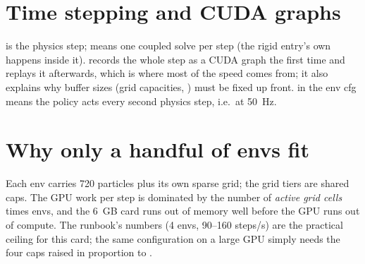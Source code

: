 \section{Time stepping and CUDA graphs}

 is the physics step; 
means one coupled solve per step (the rigid entry's own 
happens inside it).  records the whole step as a
CUDA graph the first time and replays it afterwards, which is where most of
the speed comes from; it also explains why buffer sizes (grid capacities,
) must be fixed up front.  in the env cfg
means the policy acts every second physics step, i.e.\ at 50~Hz.

\section{Why only a handful of envs fit}

Each env carries 720 particles plus its own sparse grid; the grid tiers are
shared caps. The GPU work per step is dominated by the number of \emph{active
grid cells} times envs, and the 6~GB card runs out of memory well before the
GPU runs out of compute. The runbook's numbers (4 envs, 90--160 steps/s) are
the practical ceiling for this card; the same configuration on a large GPU
simply needs the four caps raised in proportion to .
